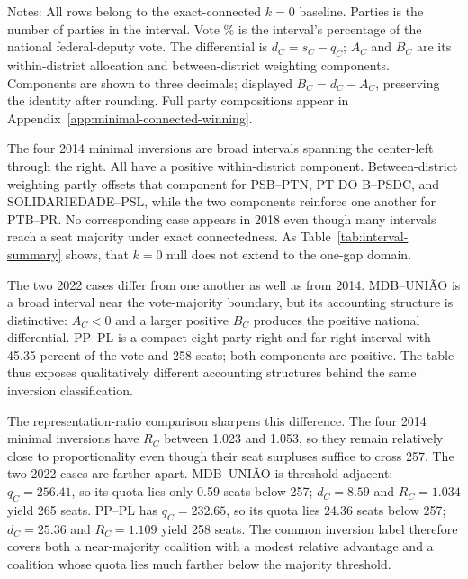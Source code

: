 \documentclass[11pt]{article}
\begin{document}
\begin{table}[htbp]
\centering
\caption{Exact-connected (\(k=0\)) minimal interval inversions and accounting components}
\label{tab:minimal-intervals}
\footnotesize
\setlength{\tabcolsep}{3pt}
\renewcommand{\arraystretch}{1.06}

\begin{flushleft}
\footnotesize Notes: All rows belong to the exact-connected \(k=0\) baseline.
Parties is the number of parties in the interval. Vote \%
is the interval's percentage of the national federal-deputy vote. The
differential is \(d_C=s_C-q_C\); \(A_C\) and \(B_C\) are its
within-district allocation and between-district weighting components.
Components are shown to three decimals; displayed \(B_C=d_C-A_C\), preserving
the identity after rounding. Full party compositions appear in
Appendix~\ref{app:minimal-connected-winning}.
\end{flushleft}
\end{table}
\FloatBarrier

The four 2014 minimal inversions are broad intervals spanning the center-left
through the right. All have a
positive within-district component. Between-district weighting partly offsets
that component for PSB--PTN, PT DO B--PSDC, and
SOLIDARIEDADE--PSL, while the two components reinforce one another for
PTB--PR. No corresponding case appears in 2018 even though many intervals
reach a seat majority under exact connectedness. As
Table~\ref{tab:interval-summary} shows, that \(k=0\) null does not extend to
the one-gap domain.

The two 2022 cases differ from one another as well as from 2014. MDB--UNIÃO is
a broad interval near the vote-majority boundary, but its accounting structure
is distinctive: \(A_C<0\) and a larger positive \(B_C\) produces the positive
national differential. PP--PL is a compact eight-party right and far-right
interval with 45.35 percent of the vote and 258 seats; both components are
positive. The table thus exposes qualitatively different accounting structures
behind the same inversion classification.

The representation-ratio comparison sharpens this difference. The four 2014
minimal inversions have \(R_C\) between 1.023 and 1.053, so they remain
relatively close to proportionality even though their seat surpluses suffice to
cross 257. The two 2022 cases are farther apart. MDB--UNIÃO is
threshold-adjacent: \(q_C=256.41\), so its quota lies only 0.59 seats below
257; \(d_C=8.59\) and \(R_C=1.034\) yield 265 seats. PP--PL has
\(q_C=232.65\), so its quota lies 24.36 seats below 257; \(d_C=25.36\) and
\(R_C=1.109\) yield 258 seats. The common inversion label therefore covers
both a near-majority coalition with a modest relative advantage and a coalition
whose quota lies much farther below the majority threshold.
\end{document}
